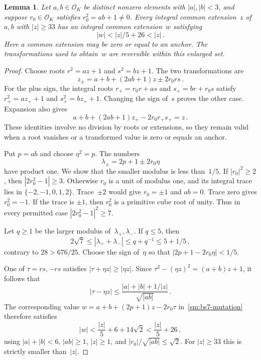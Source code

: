 \documentclass[12pt]{article}
\newtheorem{lemma}[theorem]{Lemma}
\newcommand{\OK}{\mathcal O_K}
\numberwithin{equation}{section}
\begin{document}
\begin{lemma}\label{sm:bs7-descent}
Let $a,b\in\OK$ be distinct nonzero elements with $|a|,|b|<3$, and suppose $r_0\in\OK$ satisfies $r_0^2=ab+1\ne0$. Every integral common extension~$z$ of~$a,b$ with $|z|\ge33$ has an integral common extension~$w$ satisfying
\begin{equation*}
 |w|<|z|/5+26<|z|\,.
\end{equation*}
Here a common extension may be zero or equal to an anchor. The transformations used to obtain~$w$ are reversible within this enlarged set.
\end{lemma}
\begin{proof}
Choose roots $r^2=az+1$ and $s^2=bz+1$. The two transformations are
\begin{equation}\label{sm:bs7-mutation}
 z_\pm=a+b+(2ab+1)z\pm2r_0rs\,.
\end{equation}
For the plus sign, the integral roots $r_+=r_0r+as$ and $s_+=br+r_0s$ satisfy $r_+^2=az_++1$ and $s_+^2=bz_++1$. Changing the sign of~$s$ proves the other case. Expansion also gives
\begin{equation*}
 a+b+(2ab+1)z_+-2r_0r_+s_+=z\,.
\end{equation*}
These identities involve no division by roots or extensions, so they remain valid when a root vanishes or a transformed value is zero or equals an anchor.

Put $p=ab$ and choose $\eta^2=p$. The numbers
\begin{equation*}
 \lambda_\pm=2p+1\pm2r_0\eta
\end{equation*}
have product one. We show that the smaller modulus is less than~$1/5$. If $|r_0|^2\ge2$, then $|2r_0^2-1|\ge3$. Otherwise $r_0$ is a unit of modulus one, and its integral trace lies in $\{-2,-1,0,1,2\}$. Trace~$\pm2$ would give $r_0=\pm1$ and $ab=0$. Trace zero gives $r_0^2=-1$. If the trace is $\pm1$, then $r_0^2$ is a primitive cube root of unity. Thus in every permitted case $|2r_0^2-1|^2\ge7$.

Let $q\ge1$ be the larger modulus of~$\lambda_+,\lambda_-$. If $q\le5$, then
\begin{equation*}
 2\sqrt7\le|\lambda_++\lambda_-|\le q+q^{-1}\le5+1/5\,,
\end{equation*}
contrary to $28>676/25$. Choose the sign of~$\eta$ so that $|2p+1-2r_0\eta|<1/5$.

One of $\tau=rs,-rs$ satisfies $|\tau+\eta z|\ge|\eta z|$. Since $\tau^2-(\eta z)^2=(a+b)z+1$, it follows that
\begin{equation*}
 |\tau-\eta z|\le\frac{|a|+|b|+1/|z|}{\sqrt{|ab|}}\,.
\end{equation*}
The corresponding value $w=a+b+(2p+1)z-2r_0\tau$ in~\eqref{sm:bs7-mutation} therefore satisfies
\begin{equation*}
 |w|<\frac{|z|}{5}+6+14\sqrt2<\frac{|z|}{5}+26\,,
\end{equation*}
using $|a|+|b|<6$, $|ab|\ge1$, $|z|\ge1$, and $|r_0|/\sqrt{|ab|}\le\sqrt2$. For $|z|\ge33$ this is strictly smaller than~$|z|$.
\end{proof}
\end{document}
